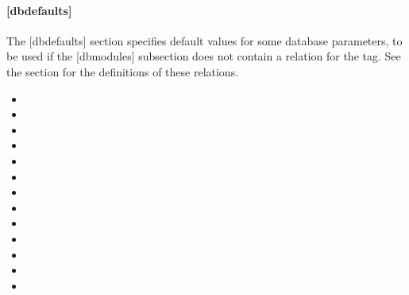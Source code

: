 \documentclass[letterpaper,10pt,english]{sphinxmanual}
\begin{document}
\paragraph{{[}dbdefaults{]}}
\label{\detokenize{admin/conf_files/kdc_conf:dbdefaults}}\label{\detokenize{admin/conf_files/kdc_conf:id2}}
\sphinxAtStartPar
The {[}dbdefaults{]} section specifies default values for some database
parameters, to be used if the {[}dbmodules{]} subsection does not contain
a relation for the tag.  See the {\hyperref[\detokenize{admin/conf_files/kdc_conf:dbmodules}]{}} section for the
definitions of these relations.
\begin{itemize}
\item {} 
\sphinxAtStartPar
{}

\item {} 
\sphinxAtStartPar
{}

\item {} 
\sphinxAtStartPar
{}

\item {} 
\sphinxAtStartPar
{}

\item {} 
\sphinxAtStartPar
{}

\item {} 
\sphinxAtStartPar
{}

\item {} 
\sphinxAtStartPar
{}

\item {} 
\sphinxAtStartPar
{}

\item {} 
\sphinxAtStartPar
{}

\item {} 
\sphinxAtStartPar
{}

\item {} 
\sphinxAtStartPar
{}

\item {} 
\sphinxAtStartPar
{}

\item {} 
\sphinxAtStartPar
{}

\end{itemize}
\end{document}
